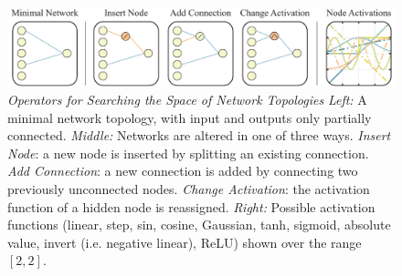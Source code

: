 


\begin{figure}[h!]        
\vskip -0.05in %
    \centering        
    \includegraphics[width=1\textwidth]{img/topOper.pdf}  
\vskip -0.05in %
    \caption      
    {     
        \textit{Operators for Searching the Space of Network Topologies}
        \newline
        \textit{Left:} A minimal network topology, with input and outputs only partially connected. 
        \newline
        \textit{Middle:} Networks are altered in one of three ways. \textit{Insert Node}: a new node is inserted by splitting an existing connection. \textit{Add Connection}: a new connection is added by connecting two previously unconnected nodes. \textit{Change Activation}: the activation function of a hidden node is reassigned.
        \newline %
        \textit{Right:} Possible activation functions (linear, step, sin, cosine, Gaussian, tanh, sigmoid, absolute value, invert (i.e. negative linear), ReLU) shown over the range $[2,2]$.
        }         
    \label{fig:topsearch}   
\vskip -0.05in %
\end{figure}